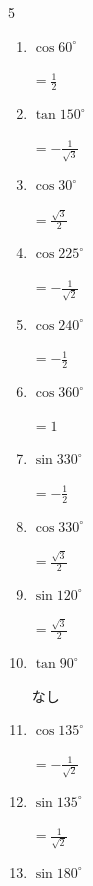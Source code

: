 \begin{multicols}{5}
\begin{enumerate}
        $\displaystyle =-\frac{1}{2}$

  \item $\displaystyle \cos{60^\circ}$

        $\displaystyle =\frac{1}{2}$

  \item $\displaystyle \tan{150^\circ}$

        $\displaystyle =-\frac{1}{\sqrt{3}}$

\columnbreak %

  \item $\displaystyle \cos{30^\circ}$

        $\displaystyle =\frac{\sqrt{3}}{2}$

  \item $\displaystyle \cos{225^\circ}$

        $\displaystyle =-\frac{1}{\sqrt{2}}$

  \item $\displaystyle \cos{240^\circ}$

        $\displaystyle =-\frac{1}{2}$

  \item $\displaystyle \cos{360^\circ}$

        $\displaystyle =1$

  \item $\displaystyle \sin{330^\circ}$

        $\displaystyle =-\frac{1}{2}$

  \item $\displaystyle \cos{330^\circ}$

        $\displaystyle =\frac{\sqrt{3}}{2}$

  \item $\displaystyle \sin{120^\circ}$

        $\displaystyle =\frac{\sqrt{3}}{2}$

  \item $\displaystyle \tan{90^\circ}$

        $\displaystyle なし$

  \item $\displaystyle \cos{135^\circ}$

        $\displaystyle =-\frac{1}{\sqrt{2}}$

  \item $\displaystyle \sin{135^\circ}$

        $\displaystyle =\frac{1}{\sqrt{2}}$

  \item $\displaystyle \sin{180^\circ}$


\end{enumerate}
\end{multicols}
